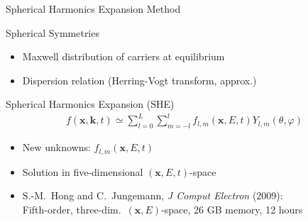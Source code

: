 \begin{frame}{Spherical Harmonics Expansion Method}

 \vspace*{-0.3cm}
  \begin{block}{Spherical Symmetries}
  \begin{itemize}
   \item Maxwell distribution of carriers at equilibrium
   \item Dispersion relation (Herring-Vogt transform, approx.)
  \end{itemize}
  \end{block}

 
     \vspace*{0.62cm}
  \begin{block}{Spherical Harmonics Expansion (SHE)}
     \vspace*{-0.5cm}
      { %
       \begin{align*}
	f(\mathbf x, \mathbf k, t) \simeq \sum_{l = 0}^L \sum_{m=-l}^l f_{l,m}(\mathbf x, E, t) Y_{l,m}(\theta, \varphi)
      \end{align*}}
     \vspace*{-0.5cm}
    \begin{itemize}
     \item New unknowns: $f_{l,m}(\mathbf x, E, t)$
     \item Solution in five-dimensional $(\mathbf x, E, t)$-space
     \item S.-M.~Hong and C.~Jungemann, \textit{J Comput Electron} (2009): \\
           Fifth-order, three-dim.~$(\mathbf x, E)$-space, 26 GB memory, 12 hours
    \end{itemize}
   \end{block}


\end{frame}



